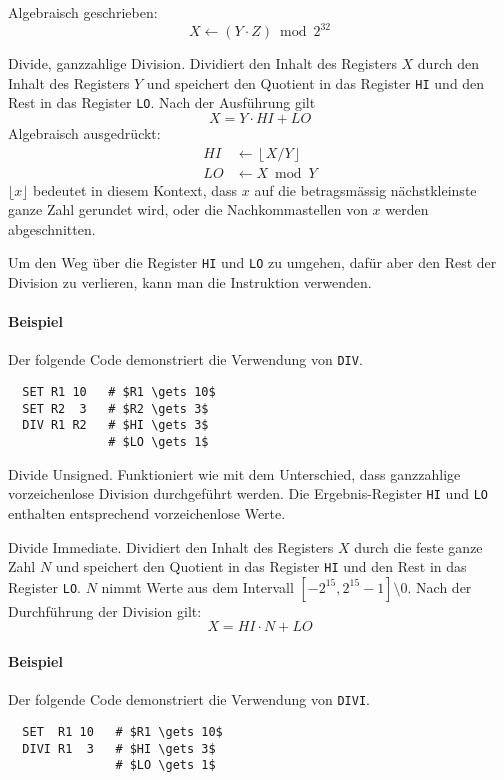 Algebraisch geschrieben:
\[
    X \gets (Y \cdot Z) \bmod 2^{32}
\]



\glqq Divide\grqq, ganzzahlige Division.
Dividiert den Inhalt des Registers $X$ durch den Inhalt des Registers $Y$ und
speichert den Quotient in das Register \texttt{HI} und den Rest in das Register
\texttt{LO}.
Nach der Ausführung gilt
\[
    X = Y \cdot HI + LO
\]
Algebraisch ausgedrückt:
\begin{align*}
  HI & \gets \left\lfloor X/Y \right\rfloor \\
  LO & \gets X \bmod Y
\end{align*}
$\lfloor x \rfloor$ bedeutet in diesem Kontext, dass $x$ auf die betragsmässig
nächstkleinste ganze Zahl gerundet wird, oder die Nachkommastellen von $x$
werden abgeschnitten.

Um den Weg über die Register \texttt{HI} und \texttt{LO} zu umgehen, dafür aber
den Rest der Division zu verlieren, kann man die Instruktion 
verwenden.

\paragraph{Beispiel}
Der folgende Code demonstriert die Verwendung von \texttt{DIV}.
\begin{lstlisting}
  SET R1 10   # $R1 \gets 10$
  SET R2  3   # $R2 \gets 3$
  DIV R1 R2   # $HI \gets 3$
              # $LO \gets 1$
\end{lstlisting}


\glqq Divide Unsigned\grqq.
Funktioniert wie  mit dem Unterschied, dass ganzzahlige
vorzeichenlose Division durchgeführt werden. Die Ergebnis-Register \texttt{HI}
und \texttt{LO} enthalten entsprechend vorzeichenlose Werte.



\glqq Divide Immediate\grqq.
Dividiert den Inhalt des Registers $X$ durch die feste ganze Zahl $N$ und
speichert den Quotient in das Register \texttt{HI} und den Rest in das Register
\texttt{LO}.
$N$ nimmt Werte aus dem Intervall $[-2^{15}, 2^{15}-1] \setminus 0$.
Nach der Durchführung der Division gilt:
\[
    X = HI \cdot N + LO 
\]
\paragraph{Beispiel}
Der folgende Code demonstriert die Verwendung von \texttt{DIVI}.
\begin{lstlisting}
  SET  R1 10   # $R1 \gets 10$
  DIVI R1  3   # $HI \gets 3$
               # $LO \gets 1$
\end{lstlisting}



